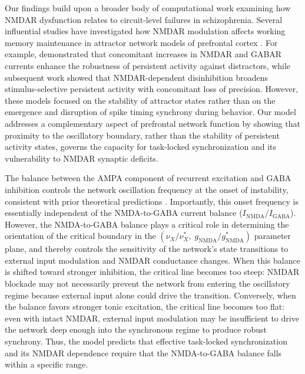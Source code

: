 \documentclass[10pt]{article}
\begin{document}
Our findings build upon a broader body of computational work examining how NMDAR dysfunction relates to circuit-level failures in schizophrenia. Several influential studies have investigated how NMDAR modulation affects working memory maintenance in attractor network models of prefrontal cortex \citep{compte2000synaptic, wang1999synaptic, brunel2001effects}. For example, \citet{compte2000synaptic} demonstrated that concomitant increases in NMDAR and GABAR currents enhance the robustness of persistent activity against distractors, while subsequent work showed that NMDAR-dependent disinhibition broadens stimulus-selective persistent activity with concomitant loss of precision. However, these models focused on the stability of attractor states rather than on the emergence and disruption of spike timing synchrony during behavior. Our model addresses a complementary aspect of prefrontal network function by showing that proximity to the oscillatory boundary, rather than the stability of persistent activity states, governs the capacity for task-locked synchronization and its vulnerability to NMDAR synaptic deficits.

The balance between the AMPA component of recurrent excitation and GABA inhibition controls the network oscillation frequency at the onset of instability, consistent with prior theoretical predictions \citep{brunel2003fast}. Importantly, this onset frequency is essentially independent of the NMDA-to-GABA current balance ($I_{\mathrm{NMDA}}/I_{\mathrm{GABA}}$). However, the NMDA-to-GABA balance plays a critical role in determining the orientation of the critical boundary in the $(\nu_X/\nu_X^*, \; g_{\mathrm{NMDA}}/g_{\mathrm{NMDA}}^*)$ parameter plane, and thereby controls the sensitivity of the network's state transitions to external input modulation and NMDAR conductance changes. When this balance is shifted toward stronger inhibition, the critical line becomes too steep: NMDAR blockade may not necessarily prevent the network from entering the oscillatory regime because external input alone could drive the transition. Conversely, when the balance favors stronger tonic excitation, the critical line becomes too flat: even with intact NMDAR, external input modulation may be insufficient to drive the network deep enough into the synchronous regime to produce robust synchrony. Thus, the model predicts that effective task-locked synchronization and its NMDAR dependence require that the NMDA-to-GABA balance falls within a specific range.
\end{document}

